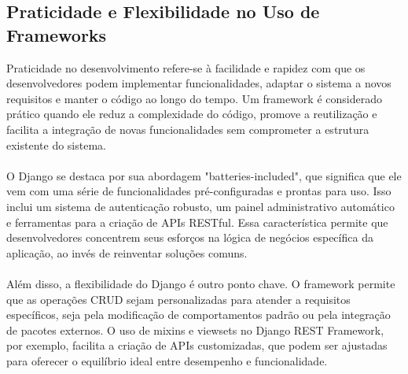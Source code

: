 \documentclass[11pt]{article} %
\begin{document}
\subsection{Praticidade e Flexibilidade no Uso de Frameworks}
Praticidade no desenvolvimento refere-se à facilidade e rapidez com que os desenvolvedores podem implementar funcionalidades, adaptar o sistema a novos requisitos e manter o código ao longo do tempo. Um framework é considerado prático quando ele reduz a complexidade do código, promove a reutilização e facilita a integração de novas funcionalidades sem comprometer a estrutura existente do sistema. 
\\\\
O Django se destaca por sua abordagem "batteries-included", que significa que ele vem com uma série de funcionalidades pré-configuradas e prontas para uso. Isso inclui um sistema de autenticação robusto, um painel administrativo automático e ferramentas para a criação de APIs RESTful. Essa característica permite que desenvolvedores concentrem seus esforços na lógica de negócios específica da aplicação, ao invés de reinventar soluções comuns. 
\\\\
Além disso, a flexibilidade do Django é outro ponto chave. O framework permite que as operações CRUD sejam personalizadas para atender a requisitos específicos, seja pela modificação de comportamentos padrão ou pela integração de pacotes externos. O uso de mixins e viewsets no Django REST Framework, por exemplo, facilita a criação de APIs customizadas, que podem ser ajustadas para oferecer o equilíbrio ideal entre desempenho e funcionalidade.
\end{document}
